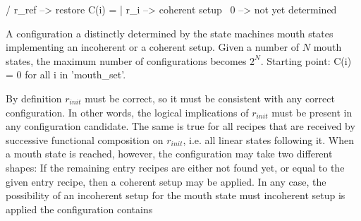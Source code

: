 \documentclass[12pt,a4paper]{scrartcl}
\begin{document}
       / r_{ref} --> restore
C(i) = | r_i  --> coherent setup
       \ 0     --> not yet determined

A configuration a distinctly determined by the state
machines mouth states implementing an incoherent or a coherent setup. Given a
number of $N$ mouth states, the maximum number of configurations becomes $2^N$.
Starting point: C(i) = 0 for all i in 'mouth_set'.


By definition $r_{init}$ must be correct, so it must be consistent with any
correct configuration. In other words, the logical implications of $r_{init}$
must be present in any configuration candidate. The same is true for all
recipes that are received by successive functional composition on $r_{init}$, 
i.e. all linear states following it. When a mouth state is reached, however,
the configuration may take two different shapes: If the remaining entry 
recipes are either not found yet, or equal to the given entry recipe, then
a coherent setup may be applied. In any case, the possibility of an 
incoherent setup for the mouth state must 
incoherent setup is applied the configuration contains
\end{document}
